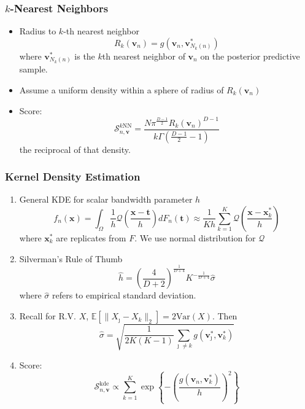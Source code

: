 \documentclass[aspectratio=169,10pt]{beamer}
\begin{document}
\begin{frame}
    \frametitle{$k$-Nearest Neighbors}
    \begin{itemize}
        \item Radius to $k$-th nearest neighbor
        \[
            R_k(\bm{v}_n) = g\left(\bm{v}_n,\bm{v}_{N_k(n)}^*\right)
        \]
        where $\bm{v}_{N_k(n)}^*$ is the $k$th nearest neighbor of $\bm{v}_n$ on the posterior predictive sample.
        \item Assume a uniform density within a sphere of radius of $R_k(\bm{v}_n)$
        \item Score:
        \[
            \mathcal{S}_{n,\bm{v}}^{\text{$k$NN}} = \frac{N\pi^{\frac{D-1}{2}}R_k(\bm{v}_n)^{D-1}}{k\Gamma(\frac{D-1}{2} - 1)}
        \]
        the reciprocal of that density.
    \end{itemize}
\end{frame} %

\begin{frame}
    \frametitle{Kernel Density Estimation}
    {\footnotesize
    \begin{enumerate}
        \item General KDE for scalar bandwidth parameter $h$
        \[
        f_n(\bm{x}) = \int_{\Omega}\frac{1}{h}\mathcal{Q}\left(\frac{\bm{x} 
                - \bm{t}}{h}\right)dF_n(\bm{t})
            \approx \frac{1}{Kh}\sum_{k = 1}^K\mathcal{Q}\left(\frac{\bm{x} 
                - \bm{x}_k^*}{h}\right)
        \]
        where $\bm{x}_k^*$ are replicates from $F$.  We use normal distribution 
            for $\mathcal{Q}$
        \item Silverman's Rule of Thumb
        \[
            \hat{h} = \left(\frac{4}{D + 2}\right)^{
                \frac{1}{D + 4}}K^{-\frac{1}{D+4}}
                \hat{\sigma}
        \]
        where $\hat{\sigma}$ refers to empirical standard deviation.
        \item Recall for R.V. $X$, 
            $\mathbb{E}\left[\lVert X_{\jmath} - X_k\rVert_2\right] = 2\text{Var}(X)$.  
            Then
        \[
            \hat{\sigma} = 
                \sqrt{\frac{1}{2K(K-1)}\sum_{\jmath \neq k}
                    g\left(\bm{v}_{\jmath}^*,\bm{v}_k^*\right)}
        \]
        \item Score:
        \[
        \mathcal{S}_{n,\bm{v}}^{\text{kde}} \propto 
            \sum_{k=1}^K\exp\left\lbrace-\left(
                \frac{g(\bm{v}_n,\bm{v}_k^*)}{h}\right)^2\right\rbrace
        \]
    \end{enumerate}
    }
\end{frame} %
\end{document}
